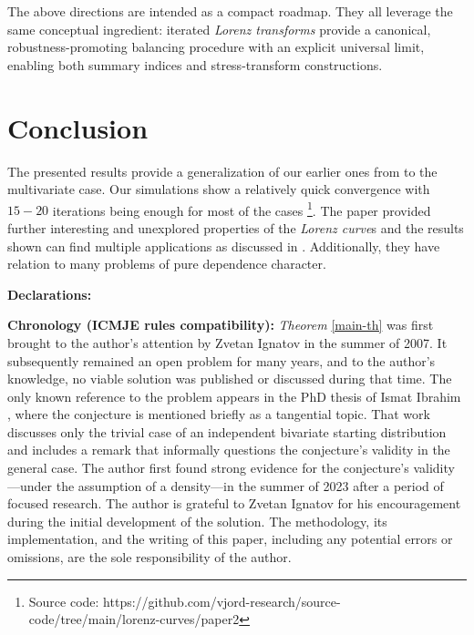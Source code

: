 \documentclass[onecolumn]{article}
\begin{document}
\medskip The above directions are intended as a compact roadmap. They all
leverage the same conceptual ingredient: iterated \textit{Lorenz transforms}
provide a canonical, robustness-promoting balancing procedure with an
explicit universal limit, enabling both summary indices and stress-transform
constructions.

\section{Conclusion}

The presented results provide a generalization of our earlier ones from \cite%
{[3]} to the multivariate case. Our simulations show a relatively quick
convergence with $15-20$ iterations being enough for most of the cases%
\footnote{{\footnotesize Source code:
https://github.com/vjord-research/source-code/tree/main/lorenz-curves/paper2}%
}. The paper provided further interesting and unexplored properties of the 
\textit{Lorenz curve}s and the results shown can find multiple applications
as discussed in \cite{[3]}. Additionally, they have relation to many
problems of pure dependence character.

\bigskip

\bigskip

\bigskip

\textbf{Declarations:}

\textbf{Chronology (ICMJE rules compatibility): }{\small \textit{Theorem} %
\ref{main-th} was first brought to the author's attention by Zvetan Ignatov
in the summer of 2007. It subsequently remained an open problem for many
years, and to the author's knowledge, no viable solution was published or
discussed during that time. The only known reference to the problem appears
in the PhD thesis of Ismat Ibrahim \cite{[41]}, where the conjecture is
mentioned briefly as a tangential topic. That work discusses only the
trivial case of an independent bivariate starting distribution and includes
a remark that informally questions the conjecture's validity in the general
case. The author first found strong evidence for the conjecture's
validity---under the assumption of a density---in the summer of 2023 after a
period of focused research. The author is grateful to Zvetan Ignatov for his
encouragement during the initial development of the solution. The
methodology, its implementation, and the writing of this paper, including
any potential errors or omissions, are the sole responsibility of the author.%
}

\newpage
\end{document}
